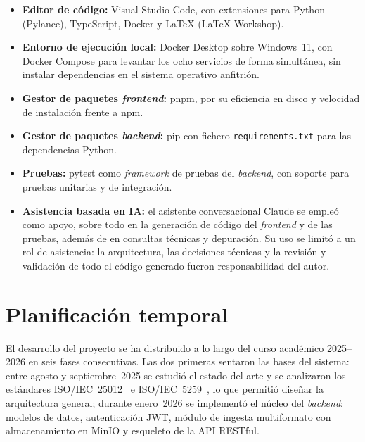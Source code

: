 \begin{itemize}
  \item \textbf{Editor de código:} Visual Studio Code, con extensiones para
    Python (Pylance), TypeScript, Docker y \LaTeX{} (LaTeX Workshop).

  \item \textbf{Entorno de ejecución local:} Docker Desktop sobre Windows~11,
    con Docker Compose para levantar los ocho servicios de forma simultánea,
    sin instalar dependencias en el sistema operativo anfitrión.

  \item \textbf{Gestor de paquetes \emph{frontend}:} pnpm, por su eficiencia
    en disco y velocidad de instalación frente a npm.

  \item \textbf{Gestor de paquetes \emph{backend}:} pip con fichero
    \texttt{requirements.txt} para las dependencias Python.

  \item \textbf{Pruebas:} pytest como \emph{framework} de pruebas del
    \emph{backend}, con soporte para pruebas unitarias y de integración.

  \item \textbf{Asistencia basada en \ac{IA}:} el asistente conversacional
    Claude se empleó como apoyo, sobre todo en la generación de código del
    \emph{frontend} y de las pruebas, además de en consultas técnicas y
    depuración.  Su uso se limitó a un rol de asistencia: la arquitectura, las
    decisiones técnicas y la revisión y validación de todo el código generado
    fueron responsabilidad del autor.
\end{itemize}

\section{Planificación temporal}
\label{sec:planificacion}

El desarrollo del proyecto se ha distribuido a lo largo del curso académico
2025--2026 en seis fases consecutivas.  Las dos primeras sentaron las bases del
sistema: entre agosto y septiembre~2025 se estudió el estado del arte y se
analizaron los estándares \ac{ISO}/\ac{IEC}~25012~\citep{iso25012} e
\ac{ISO}/\ac{IEC}~5259~\citep{iso5259}, lo que permitió diseñar la arquitectura
general; durante enero~2026 se implementó el núcleo del
\emph{backend}: modelos de datos, autenticación \ac{JWT}, módulo de ingesta
multiformato con almacenamiento en MinIO y esqueleto de la \ac{API}
\ac{REST}ful.

